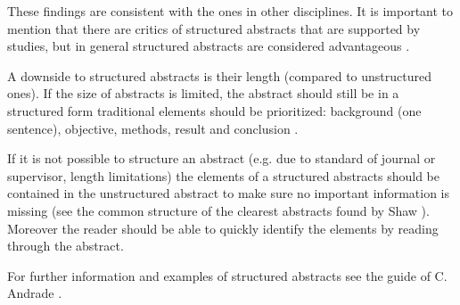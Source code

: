 These findings are consistent with the ones in other disciplines. It is important to mention that there are critics of structured abstracts that are supported by studies, but in general structured abstracts are considered advantageous \cite{hartley2004,hartley2014}.	

A downside to structured abstracts is their length (compared to unstructured ones). If the size of abstracts is limited, the abstract should still be in a structured form traditional elements should be prioritized: background (one sentence), objective, methods, result and conclusion \cite{Jedlitschka2008}.

If it is not possible to structure an abstract (e.g. due to standard of journal or supervisor, length limitations) the elements of a structured abstracts should be contained in the unstructured abstract to make sure no important information is missing (see the common structure of the clearest abstracts found by Shaw \cite{shaw2003}). Moreover the reader should be able to quickly identify the elements by reading through the abstract.

For further information  and examples of structured abstracts see the guide of C. Andrade \cite{Andrade2011}.
